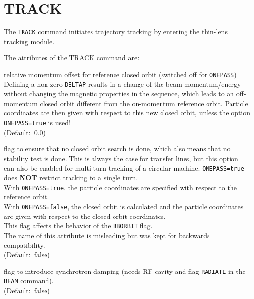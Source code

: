 \section{TRACK}
\label{sec:track}

The \texttt{TRACK} command initiates trajectory tracking by entering the 
thin-lens tracking module. 


The attributes of the TRACK command are:

\begin{madlist}
   relative momentum offset for reference closed orbit (switched
  off for \texttt{ONEPASS}) \\  
  Defining a non-zero \texttt{DELTAP} results in a change of the beam
  momentum/energy without changing the magnetic properties in the
  sequence, which leads to an off-momentum closed orbit different from
  the on-momentum reference orbit. Particle coordinates are then given
  with respect to this new closed orbit, unless the option
  \texttt{ONEPASS=true} is used! \\  
  (Default:~0.0)

   flag to ensure that no closed orbit search is done,
  which also means that no stability test is done. This is always the
  case for transfer lines, but this option can also be enabled for
  multi-turn tracking of a circular machine. \texttt{ONEPASS=true} does
  \textbf{NOT} restrict tracking to a single turn. \\
  With \texttt{ONEPASS=true}, the particle coordinates are specified with
  respect to the reference orbit. \\  
  With \texttt{ONEPASS=false}, the closed orbit is calculated and the particle
  coordinates are given with respect to the closed orbit coordinates.\\
  This flag affects the behavior of the \hyperref[sec:option]{\texttt{BBORBIT}} flag. \\
  The name of this attribute is misleading but was kept for backwards
  compatibility.  \\ 
  (Default:~false)

   flag to introduce synchrotron damping (needs RF cavity
  and flag \texttt{RADIATE} in the \texttt{BEAM} command). \\ (Default:~false)


\end{madlist}
